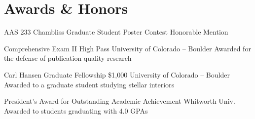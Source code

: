 \section{Awards \& Honors}

		{AAS 233 Chambliss Graduate Student Poster Contest}
		{Honorable Mention}
		{}
		{}
		{}

		{Comprehensive Exam II High Pass}
		{}
		{University of Colorado -- Boulder}
		{}
		{Awarded for the defense of publication-quality research}

        {Carl Hansen Graduate Fellowship}
        {\$1,000}
        {University of Colorado -- Boulder}
        {}
        {Awarded to a graduate student studying stellar interiors}


        {President's Award for Outstanding Academic Achievement}
        {}
        {Whitworth Univ.}
        {}
        {Awarded to students graduating with 4.0 GPAs}


